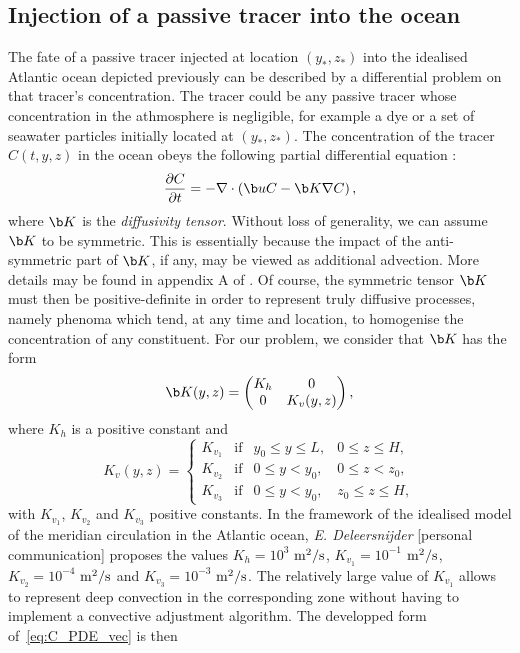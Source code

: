 \subsection{Injection of a passive tracer into the ocean} \label{sec:transport_overturner}
The fate of a passive tracer injected at location $(y_*,z_*)$ into the idealised Atlantic ocean depicted previously can be described by a differential problem on that tracer's concentration. The tracer could be any passive tracer whose concentration in the athmosphere is negligible, for example a dye or a set of seawater particles initially located at $(y_*,z_*)$. The concentration of the tracer $C(t,y,z)$ in the ocean obeys the following partial differential equation :
\begin{equation}\label{eq:C_PDE_vec}
	\frac{\partial C}{\partial t} = -\nabla \cdot \left(\b uC - \b K \nabla C\right),
\end{equation}
where $\b K$ is the \textit{diffusivity tensor}. Without loss of generality, we can assume $\b K$ to be symmetric. This is essentially because the impact of the anti-symmetric part of $\b K$, if any, may be viewed as additional advection. More details may be found in appendix A of \cite{deleersnijder2001concept}. Of course, the symmetric tensor $\b K$ must then be positive-definite in order to represent truly diffusive processes, namely phenoma which tend, at any time and location, to homogenise the concentration of any constituent. For our problem, we consider that $\b K$ has the form
\begin{equation} \label{eq:K}
	\b K(y,z) = \begin{pmatrix} K_h & 0 \\ 0 & K_v(y,z) \end{pmatrix},
\end{equation}
where $K_h$ is a positive constant and
\begin{equation} \label{eq:Kv}
	K_v(y,z) = \left\{ 
		\begin{array}{lrrr}
			K_{v_1} & \mbox{if} & y_0 \le y \le L, & 0 \le z \le H,\\
			K_{v_2} & \mbox{if} & 0 \le y < y_0, & 0 \le z < z_0,\\
			K_{v_3} & \mbox{if} & 0 \le y < y_0, & z_0 \le z \le H,
		\end{array}
	\right.
\end{equation}
with $K_{v_1}$, $K_{v_2}$ and $K_{v_3}$ positive constants. In the framework of the idealised model of the meridian circulation in the Atlantic ocean, \textit{E. Deleersnijder} [personal communication] proposes the values $K_h = 10^3$ $\rm{m^2/s}$, $K_{v_1} = 10^{-1}$ $\rm{m^2/s}$, $K_{v_2} = 10^{-4}$ $\rm{m^2/s}$ and $K_{v_3} = 10^{-3}$ $\rm{m^2/s}$. The relatively large value of $K_{v_1}$ allows to represent deep convection in the corresponding zone without having to implement a convective adjustment algorithm. The developped form of~\eqref{eq:C_PDE_vec} is then
